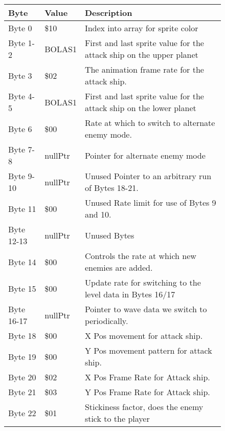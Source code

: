 \begin{figure}[H]
{\begin{adjustbox}{width=12cm}
\begin{tabular}{lll}
\toprule
 Byte       & Value              & Description                                                         \\
\midrule
 Byte 0     & \$10                & Index into array for sprite color                                   \\
 Byte 1-2   & BOLAS1             & First and last sprite value for the attack ship on the upper planet \\
 Byte 3     & \$02                & The animation frame rate for the attack ship.                       \\
 Byte 4-5   & BOLAS1             & First and last sprite value for the attack ship on the lower planet \\
 Byte 6     & \$00                & Rate at which to switch to alternate enemy mode.                    \\
 Byte 7-8   & nullPtr            & Pointer for alternate enemy mode                                    \\
 Byte 9-10  & nullPtr            & Unused Pointer to an arbitrary run of Bytes 18-21.                  \\
 Byte 11    & \$00                & Unused Rate limit for use of Bytes 9 and 10.                        \\
 Byte 12-13 & nullPtr            & Unused Bytes                                                        \\
 Byte 14    & \$00                & Controls the rate at which new enemies are added.                   \\
 Byte 15    & \$00                & Update rate for switching to the level data in Bytes 16/17          \\
 Byte 16-17 & nullPtr            & Pointer to wave data we switch to periodically.                     \\
 Byte 18    & \$00                & X Pos movement for attack ship.                                     \\
 Byte 19    & \$00                & Y Pos movement pattern for attack ship.                             \\
 Byte 20    & \$02                & X Pos Frame Rate for Attack ship.                                   \\
 Byte 21    & \$03                & Y Pos Frame Rate for Attack ship.                                   \\
 Byte 22    & \$01                & Stickiness factor, does the enemy stick to the player               \\

\end{tabular}
\end{adjustbox}}
\end{figure}
